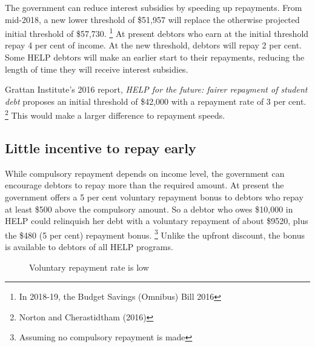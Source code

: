 \documentclass[embargoed]{grattan}
\begin{document}
{The government can reduce interest subsidies by speeding up repayments.
From mid-2018, a new lower threshold of \$51,957 will replace the otherwise projected initial threshold of \$57,730.%
\footnote{In 2018-19, the Budget Savings (Omnibus) Bill 2016} At present debtors who earn at the initial threshold repay 4 per cent of income.
At the new threshold, debtors will repay 2 per cent.
Some \gls{HELP} debtors will make an earlier start to their repayments, reducing the length of time they will receive interest subsidies.

Grattan Institute's 2016 report, \emph{HELP for the future: fairer repayment of student debt} proposes an initial threshold of \$42,000 with a repayment rate of 3 per cent.%
\footnote{Norton and Cherastidtham (2016)} This would make a larger difference to repayment speeds.

\subsection{Little incentive to repay early}\label{little-incentive-to-repay-early}

While compulsory repayment depends on income level, the government can encourage debtors to repay more than the required amount.
At present the government offers a 5 per cent voluntary repayment bonus to debtors who repay at least \$500 above the compulsory amount.
So a debtor who owes \$10,000 in \gls{HELP} could relinquish her debt with a voluntary repayment of about \$9520, plus the \$480 (5 per cent) repayment bonus.%
\footnote{Assuming no compulsory repayment is made} Unlike the upfront discount, the bonus is available to debtors of all \gls{HELP} programs.

\begin{figure}
\caption{Voluntary repayment rate is low}\label{fig:fig8-voluntary-repayment-rate-is-low}


\end{figure}}
\end{document}
